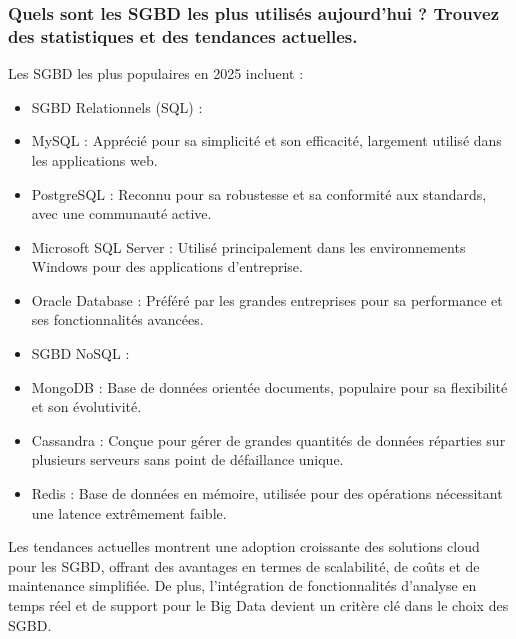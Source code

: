 \documentclass{article}
\begin{document}
\subsubsection{Quels sont les SGBD les plus utilisés aujourd’hui ? Trouvez des statistiques et des tendances 
actuelles.}
Les SGBD les plus populaires en 2025 incluent :
\begin{itemize}
  \item SGBD Relationnels (SQL) :
  \item MySQL : Apprécié pour sa simplicité et son efficacité, largement utilisé dans les applications web.
  \item PostgreSQL : Reconnu pour sa robustesse et sa conformité aux standards, avec une communauté active.
  \item Microsoft SQL Server : Utilisé principalement dans les environnements Windows pour des applications d’entreprise.
  \item Oracle Database : Préféré par les grandes entreprises pour sa performance et ses fonctionnalités avancées.
  \item SGBD NoSQL :
  \item MongoDB : Base de données orientée documents, populaire pour sa flexibilité et son évolutivité.
  \item Cassandra : Conçue pour gérer de grandes quantités de données réparties sur plusieurs serveurs sans point de défaillance unique.
  \item Redis : Base de données en mémoire, utilisée pour des opérations nécessitant une latence extrêmement faible.
\end{itemize}

Les tendances actuelles montrent une adoption croissante des solutions cloud pour les SGBD, offrant des avantages en termes de scalabilité, de coûts et de maintenance simplifiée. De plus, l’intégration de fonctionnalités d’analyse en temps réel et de support pour le Big Data devient un critère clé dans le choix des SGBD.
\end{document}
